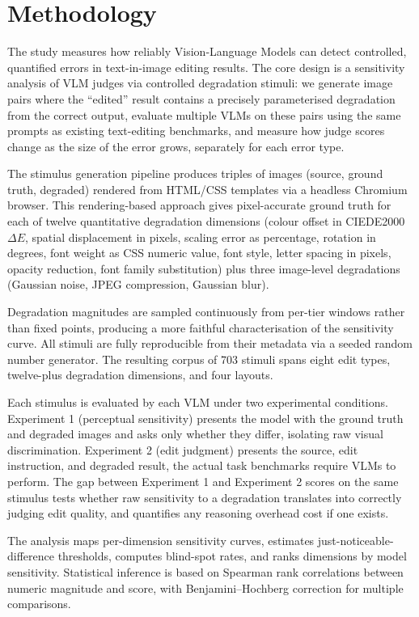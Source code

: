 \chapter{Methodology} \label{Methodology}

The study measures how reliably Vision-Language Models can detect controlled, quantified errors in text-in-image editing results. The core design is a sensitivity analysis of VLM judges via controlled degradation stimuli: we generate image pairs where the ``edited'' result contains a precisely parameterised degradation from the correct output, evaluate multiple VLMs on these pairs using the same prompts as existing text-editing benchmarks, and measure how judge scores change as the size of the error grows, separately for each error type.

The stimulus generation pipeline produces triples of images (source, ground truth, degraded) rendered from HTML/CSS templates via a headless Chromium browser. This rendering-based approach gives pixel-accurate ground truth for each of twelve quantitative degradation dimensions (colour offset in CIEDE2000 $\Delta E$, spatial displacement in pixels, scaling error as percentage, rotation in degrees, font weight as CSS numeric value, font style, letter spacing in pixels, opacity reduction, font family substitution) plus three image-level degradations (Gaussian noise, JPEG compression, Gaussian blur).

Degradation magnitudes are sampled continuously from per-tier windows rather than fixed points, producing a more faithful characterisation of the sensitivity curve. All stimuli are fully reproducible from their metadata via a seeded random number generator. The resulting corpus of 703 stimuli spans eight edit types, twelve-plus degradation dimensions, and four layouts.

Each stimulus is evaluated by each VLM under two experimental conditions. Experiment 1 (perceptual sensitivity) presents the model with the ground truth and degraded images and asks only whether they differ, isolating raw visual discrimination. Experiment 2 (edit judgment) presents the source, edit instruction, and degraded result, the actual task benchmarks require VLMs to perform. The gap between Experiment 1 and Experiment 2 scores on the same stimulus tests whether raw sensitivity to a degradation translates into correctly judging edit quality, and quantifies any reasoning overhead cost if one exists.

The analysis maps per-dimension sensitivity curves, estimates just-noticeable-difference thresholds, computes blind-spot rates, and ranks dimensions by model sensitivity. Statistical inference is based on Spearman rank correlations between numeric magnitude and score, with Benjamini--Hochberg correction for multiple comparisons.


